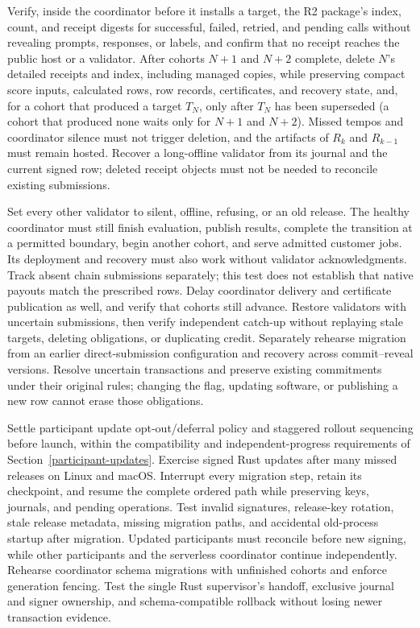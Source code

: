 Verify, inside the coordinator before it installs a target, the R2 package's
index, count, and receipt digests for successful, failed, retried, and pending
calls without revealing prompts, responses, or labels, and
confirm that no receipt reaches the public host or a validator. After cohorts
\(N+1\) and \(N+2\) complete, delete \(N\)'s detailed receipts and index,
including managed copies, while preserving compact score inputs, calculated
rows, row records, certificates, and recovery state, and, for a cohort that
produced a target \(T_N\), only after \(T_N\) has been superseded (a cohort that
produced none waits only for \(N+1\) and \(N+2\)). Missed tempos and coordinator silence must not trigger
deletion, and the artifacts of \(R_k\) and \(R_{k-1}\) must remain hosted.
Recover a long-offline validator from its journal and the current signed row;
deleted receipt objects must not be needed to reconcile existing submissions.

Set every other validator to silent, offline, refusing, or an old release.
The healthy coordinator must still finish evaluation, publish results, complete
the transition at a permitted boundary, begin another cohort, and serve admitted
customer jobs. Its deployment and recovery must also work without validator
acknowledgments. Track absent chain submissions separately; this test does not
establish that native payouts match the prescribed rows. Delay coordinator delivery
and certificate publication as well, and verify that cohorts still advance.
Restore validators with uncertain submissions, then verify
independent catch-up without replaying stale targets, deleting obligations, or
duplicating credit.
Separately rehearse migration from an earlier direct-submission configuration
and recovery across commit--reveal versions. Resolve uncertain transactions and
preserve existing commitments under their original rules; changing the flag,
updating software, or publishing a new row cannot erase those obligations.

Settle participant update opt-out/deferral policy and staggered rollout sequencing
before launch, within the compatibility and independent-progress requirements
of Section~\ref{participant-updates}.
Exercise signed Rust updates after many missed releases on Linux and macOS.
Interrupt every migration step, retain its checkpoint, and resume the complete
ordered path while preserving keys, journals, and pending operations. Test
invalid signatures, release-key rotation, stale release metadata, missing
migration paths, and accidental old-process startup after migration. Updated
participants must reconcile before new signing, while other participants and
the serverless coordinator continue independently. Rehearse coordinator schema
migrations with unfinished cohorts and enforce generation fencing. Test the
single Rust supervisor's handoff, exclusive journal and signer ownership, and
schema-compatible rollback without losing newer transaction evidence.

